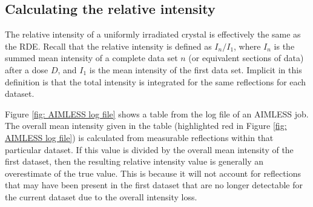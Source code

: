 \subsection{Calculating the relative intensity}
\label{sub:Calculating the relative intensity}
The relative intensity of a uniformly irradiated crystal is effectively the same as the RDE.
Recall that the relative intensity is defined as $I_n/I_1$, where $I_n$ is the summed mean intensity of a complete data set $n$ (or equivalent sections of data) after a dose $D$, and $I_1$ is the mean intensity of the first data set.
Implicit in this definition is that the total intensity is integrated for the same reflections for each dataset.

Figure \ref{fig: AIMLESS log file} shows a table from the log file of an AIMLESS job.
The overall mean intensity given in the table (highlighted red in Figure \ref{fig: AIMLESS log file}) is calculated from measurable reflections within that particular dataset.
If this value is divided by the overall mean intensity of the first dataset, then the resulting relative intensity value is generally an overestimate of the true value.
This is because it will not account for reflections that may have been present in the first dataset that are no longer detectable for the current dataset due to the overall intensity loss.

